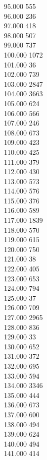 { 95.000	555 \\
 96.000	236 \\
 97.000	418 \\
 98.000	507 \\
 99.000	737 \\
 100.000	1072 \\
 101.000	36 \\
 102.000	739 \\
 103.000	2847 \\
 104.000	3663 \\
 105.000	624 \\
 106.000	566 \\
 107.000	246 \\
 108.000	673 \\
 109.000	423 \\
 110.000	425 \\
 111.000	379 \\
 112.000	430 \\
 113.000	573 \\
 114.000	576 \\
 115.000	376 \\
 116.000	589 \\
 117.000	1839 \\
 118.000	570 \\
 119.000	615 \\
 120.000	750 \\
 121.000	38 \\
 122.000	405 \\
 123.000	653 \\
 124.000	794 \\
 125.000	37 \\
 126.000	709 \\
 127.000	2965 \\
 128.000	836 \\
 129.000	33 \\
 130.000	652 \\
 131.000	372 \\
 132.000	695 \\
 133.000	594 \\
 134.000	3346 \\
 135.000	444 \\
 136.000	673 \\
 137.000	600 \\
 138.000	494 \\
 139.000	624 \\
 140.000	494 \\
 141.000	414 \\
}
